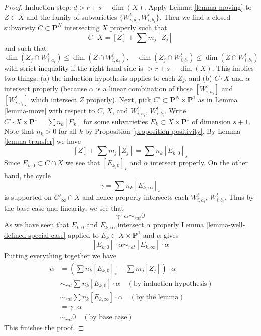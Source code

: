 \documentclass{stacks-project}
\theoremstyle{plain}
\theoremstyle{definition}
\theoremstyle{remark}
\numberwithin{equation}{subsection}
\begin{document}
\begin{proof}
\medskip\noindent
Induction step: $d >  r + s - \dim(X)$. Apply
Lemma \ref{lemma-moving} to $Z \subset X$ and
the family of subvarieties $\{W_{i, a_i}^t, W_{i, b_i}^t\}$. Then we find a
closed subvariety $C \subset \mathbf{P}^N$ intersecting $X$
properly such that
$$
C \cdot X = [Z] + \sum m_j [Z_j]
$$
and such that
$$
\dim(Z_j \cap W_{i, a_i}^t) \leq \dim(Z \cap W_{i, a_i}^t),\quad
\dim(Z_j \cap W_{i, b_i}^t) \leq \dim(Z \cap W_{i, b_i}^t)
$$
with strict inequality if the right hand side is $> r + s - \dim(X)$.
This implies two things: (a) the induction hypothesis applies to
each $Z_j$, and (b) $C \cdot X$ and $\alpha$ intersect properly (because
$\alpha$ is a linear combination of those $[W_{i, a_i}^t]$ and
$[W_{i, a_i}^t]$ which intersect $Z$ properly).
Next, pick $C' \subset \mathbf{P}^N \times \mathbf{P}^1$
as in Lemma \ref{lemma-move} with respect to $C$, $X$, and
$W_{i, a_i}^t$, $W_{i, b_i}^t$.
Write $C' \cdot X \times \mathbf{P}^1 = \sum n_k [E_k]$ for
some subvarieties $E_k \subset X \times \mathbf{P}^1$ of
dimension $s + 1$. Note that $n_k > 0$ for all $k$ by
Proposition \ref{proposition-positivity}.
By Lemma \ref{lemma-transfer} we have
$$
[Z] + \sum m_j [Z_j] = \sum n_k[E_{k, 0}]_s
$$
Since $E_{k, 0} \subset C \cap X$ we see that $[E_{k, 0}]_s$ and $\alpha$
intersect properly. On the other hand, the cycle
$$
\gamma = \sum n_k[E_{k, \infty}]_s
$$
is supported on $C'_\infty \cap X$ and hence
properly intersects each $W_{i, a_i}^t$, $W_{i, b_i}^t$.
Thus by the base case and linearity, we see that
$$
\gamma \cdot \alpha \sim_{rat} 0
$$
As we have seen that $E_{k, 0}$ and $E_{k, \infty}$
intersect $\alpha$ properly Lemma \ref{lemma-well-defined-special-case}
applied to $E_k \subset X \times \mathbf{P}^1$ and $\alpha$ gives
$$
[E_{k, 0}] \cdot \alpha \sim_{rat} [E_{k, \infty}] \cdot \alpha
$$
Putting everything together we have
\begin{align*}
[Z] \cdot \alpha
& =
(\sum n_k[E_{k, 0}]_r - \sum m_j[Z_j]) \cdot \alpha \\
& \sim_{rat}
\sum n_k [E_{k, 0}] \cdot \alpha \quad (\text{by induction hypothesis})\\
& \sim_{rat}
\sum n_k [E_{k, \infty}] \cdot \alpha \quad (\text{by the lemma})\\
& =
\gamma \cdot \alpha \\
& \sim_{rat}
0 \quad (\text{by base case})
\end{align*}
This finishes the proof.
\end{proof}
\end{document}
